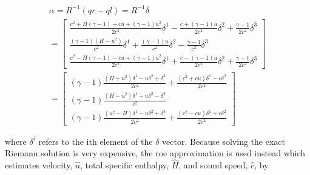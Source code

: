 \documentclass{article}%
\numberwithin{equation}{section}
\begin{document}
\begin{equation}
\begin{split}
\alpha = R^{-1}(qr - ql)  = R^{-1} \delta \\
= \left[ \begin{array}{c} \frac{c^2 + H (\gamma-1) + c u + (\gamma-1) u^2}{2 c^2} \delta^1 -\frac{c + (\gamma - 1) u}{2 c^2} \delta^2 +   \frac{\gamma - 1}{2 c^2} \delta^3 \\ \frac{ (\gamma - 1) (H - u^2)}{c^2} \delta^1 +  \frac{(\gamma - 1) u}{c^2} \delta^2 -  \frac{\gamma - 1}{ c^2}  \delta^3 \\ \frac{c^2 - H (\gamma - 1) - c u + (\gamma - 1) u^2}{2 c^2} \delta^1 + \frac{c - (\gamma - 1) u}{2 c^2} \delta^2 +   \frac{\gamma - 1}{2 c^2} \delta^3 \end{array} \right] \\
= \left[ \begin{array}{c} (\gamma - 1) \frac{(H + u^2) \delta^1 - u \delta^2 + \delta^3}{2 c^2} + \frac{(c^2 + c u) \delta^1 - c \delta^2}{2 c^2} \\ (\gamma - 1) \frac{(H - u^2)\delta^1 + u \delta^2 - \delta^3}{ c^2} \\ (\gamma - 1) \frac{(u^2 - H) \delta^1 - u \delta^2 + \delta^3}{2 c^2} + \frac{(c^2 - c u) \delta^1 + c \delta^2}{2 c^2} \end{array} \right]
\end{split} \label{coeffcients}
\end{equation}

where $\delta^i$ refers to the ith element of the $\delta$ vector. Because solving the exact Riemann solution is very expensive, the roe approximation is used instead which estimates velocity, $\hat{u}$, total specific enthalpy, $\hat{H}$, and sound speed, $\hat{c}$, by
\end{document}
